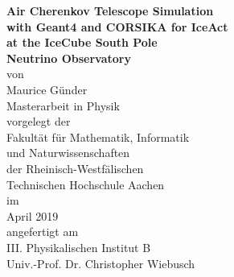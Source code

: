 \begin{titlepage}
\addtolength{\oddsidemargin}{4mm}
\begin{center}

\Large
\textbf{Air Cherenkov Telescope Simulation\\with Geant4 and CORSIKA for IceAct\\at the IceCube South Pole\\Neutrino Observatory} \\[15mm]

{\large von}\\[1mm]
\Large
Maurice Günder\\[18mm]

Masterarbeit in Physik\\[18mm]

{\large vorgelegt der}\\[1mm]
Fakultät für Mathematik, Informatik \\ 
und Naturwissenschaften \\ 
der Rheinisch-Westfälischen \\ Technischen Hochschule Aachen\\[15mm]

{\large im}\\[1mm]
April 2019\\[18mm]

{\large angefertigt am}\\[1mm]
III. Physikalischen Institut B \\ Univ.-Prof. Dr. Christopher Wiebusch\\[18mm]

\end{center}
\end{titlepage}